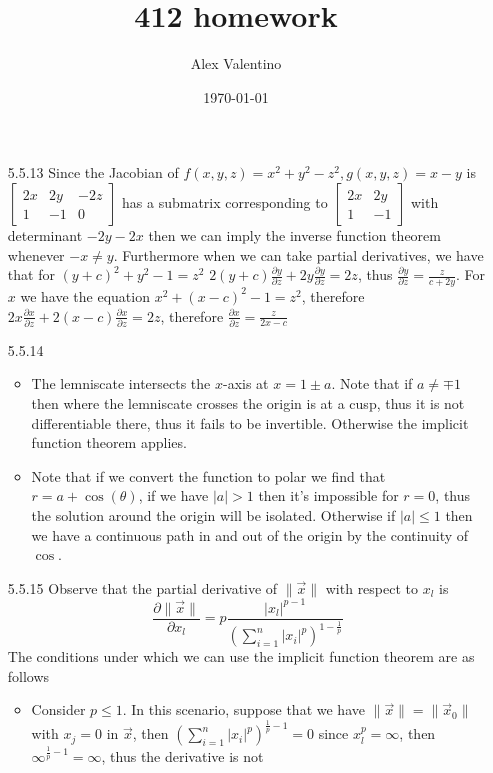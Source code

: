 \documentclass[12pt, letterpaper]{article}
\date{\today}
\author{Alex Valentino}
\title{412 homework}
\begin{document}
\begin{enumerate}
	\item[5.5.13] Since the Jacobian of $f(x,y,z) = x^2 + y^2 - z^2, g(x,y,z) = x-y$ is 
	$\begin{bmatrix} 2x & 2y & -2z\\ 1 & -1 & 0\end{bmatrix}$ has a submatrix corresponding to 
	$\begin{bmatrix} 2x & 2y\\ 1 & -1 \end{bmatrix}$ with determinant $-2y-2x$ then we can imply the inverse function theorem 
	whenever $-x \neq y$.  Furthermore when we can take partial 
	derivatives, we have that for $(y+c)^2 + y^2 - 1 = z^2$
	$2(y+c) \frac{\partial y}{\partial z} + 2y \frac{\partial y}{\partial z} = 2 z $, thus $\frac{\partial y}{\partial z}  = \frac{z}{c + 2y}$.  For $x$ we have the equation $x^2 + (x-c)^2 - 1 = z^2$, therefore $2x\frac{\partial x}{\partial z} + 2(x-c) \frac{\partial x}{\partial z} = 2z$, therefore 
	$\frac{\partial x}{\partial z} = \frac{z}{2x - c}$
	\item[5.5.14]
	\begin{itemize}
		\item The lemniscate intersects the $x$-axis at 
		$x = 1 \pm a$.  Note that if $a \neq \mp 1 $ then 
		where the lemniscate crosses the origin is at a cusp, 
		thus it is not differentiable there, thus it fails 
		to be invertible.  Otherwise the implicit function theorem 
		applies.  
		\item Note that if we convert the function to polar 
		we find that $r = a + \cos(\theta)$, if we have $|a| > 1$
		then it's impossible for $r=0$, thus the solution around 
		the origin will be isolated.  Otherwise if $|a|\leq 1$ 
		then we have a continuous path in and out of the origin
		by the continuity of $\cos$.  
	\end{itemize}
	\item[5.5.15] Observe that the partial derivative of 
	$\|\vec{x}\|$ with respect to $x_l$ is 
	$$
	\frac{\partial \|\vec{x}\|}{\partial x_l} = p \frac{|x_l|^{p-1}}{(\sum_{i=1}^n |x_i|^p)^{1-\frac{1}{p}}}
	$$
	The conditions under which we can use the 
	implicit function theorem are as follows
	\begin{itemize}
		\item Consider $p \leq 1$.  In this scenario, suppose 
		that we have $\| \vec{x}\| = \| \vec{x}_0 \|$ with 
		$x_j= 0$ in $\vec{x}$, then $(\sum_{i=1}^n |x_i|^p )^{\frac{1}{p}-1} = 0$ since $x_l^p = \infty$, then $\infty^{\frac{1}{p} - 1} = \infty$, thus the derivative is not 

\end{itemize}
\end{enumerate}
\end{document}
